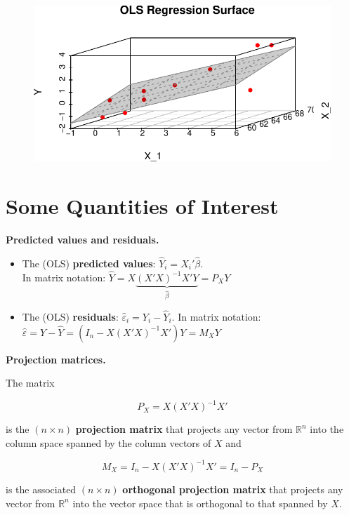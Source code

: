 \documentclass[
  letterpaper,
  DIV=11,
  numbers=noendperiod]{scrreprt}
\providecommand{\tightlist}{%
  \setlength{\itemsep}{0pt}\setlength{\parskip}{0pt}}\usepackage{longtable,booktabs,array}
\theoremstyle{definition}
\theoremstyle{plain}
\theoremstyle{plain}
\theoremstyle{remark}
\begin{document}
\begin{figure}[H]

{\centering \includegraphics{./04-MultipleReg_files/figure-pdf/unnamed-chunk-1-1.pdf}

}

\end{figure}

\hypertarget{some-quantities-of-interest}{%
\section{Some Quantities of
Interest}\label{some-quantities-of-interest}}

\textbf{Predicted values and residuals.}

\begin{itemize}
\tightlist
\item
  The (OLS) \textbf{predicted values}: \(\hat{Y}_i=X_i'\hat\beta\).\\
  In matrix notation:
  \(\hat Y=X\underbrace{(X'X)^{-1}X'Y}_{\hat\beta}=P_X Y\)
\item
  The (OLS) \textbf{residuals}: \(\hat\varepsilon_i=Y_i-\hat{Y}_i\). In
  matrix notation:
  \(\hat\varepsilon=Y-\hat{Y}=\left(I_n-X(X'X)^{-1}X'\right)Y=M_X Y\)
\end{itemize}

\textbf{Projection matrices.}

The matrix

\[
P_X=X(X'X)^{-1}X'
\]

is the \((n\times n)\) \textbf{projection matrix} that projects any
vector from \(\mathbb{R}^n\) into the column space spanned by the column
vectors of \(X\) and

\[
M_X=I_n-X(X'X)^{-1}X'=I_n-P_X
\]

is the associated \((n\times n)\) \textbf{orthogonal projection matrix}
that projects any vector from \(\mathbb{R}^n\) into the vector space
that is orthogonal to that spanned by \(X\).
\end{document}
